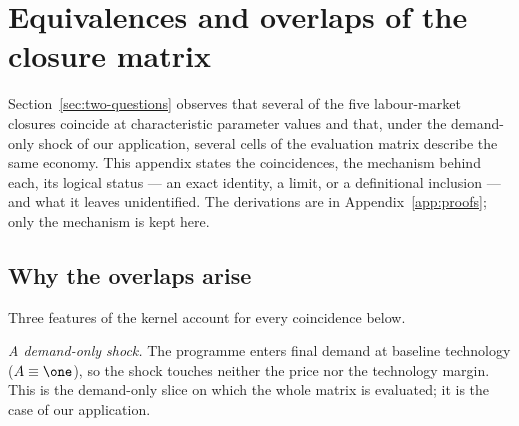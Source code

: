 \section{Equivalences and overlaps of the closure matrix}\label{app:equivalences}

\noindent
Section~\ref{sec:two-questions} observes that several of the five
labour-market closures coincide at characteristic parameter values and
that, under the demand-only shock of our application, several cells of the
evaluation matrix describe the same economy. This appendix states the
coincidences, the mechanism behind each, its logical status --- an exact
identity, a limit, or a definitional inclusion --- and what it leaves
unidentified. The derivations are in Appendix~\ref{app:proofs}; only the
mechanism is kept here.

\subsection{Why the overlaps arise}\label{app:eqwhy}

Three features of the kernel account for every coincidence below.

\emph{A demand-only shock.} The programme enters final demand at baseline
technology ($A\equiv\one$), so the shock touches neither the price nor the
technology margin. This is the demand-only slice on which the whole matrix
is evaluated; it is the case of our application.


